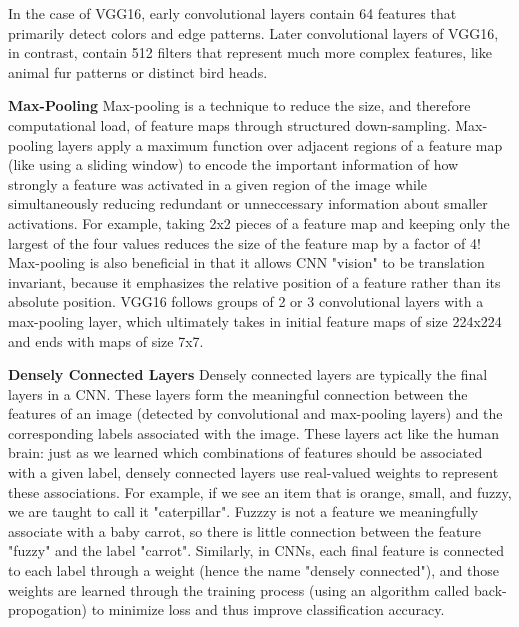 \documentclass{article}\usepackage[]{graphicx}\usepackage[]{color}
\begin{document}
In the case of VGG16, early convolutional layers contain 64 features that primarily detect colors and edge patterns. Later convolutional layers of VGG16, in contrast, contain 512 filters that represent much more complex features, like animal fur patterns or distinct bird heads.

\textbf{Max-Pooling}
Max-pooling is a technique to reduce the size, and therefore computational load, of feature maps through structured down-sampling. Max-pooling layers apply a maximum function over adjacent regions of a feature map (like using a sliding window) to encode the important information of how strongly a feature was activated in a given region of the image while simultaneously reducing redundant or unneccessary information about smaller activations. For example, taking 2x2 pieces of a feature map and keeping only the largest of the four values reduces the size of the feature map by a factor of 4! Max-pooling is also beneficial in that it allows CNN "vision" to be translation invariant, because it emphasizes the relative position of a feature rather than its absolute position. VGG16 follows groups of 2 or 3 convolutional layers with a max-pooling layer, which ultimately takes in initial feature maps of size 224x224 and ends with maps of size 7x7.

\textbf{Densely Connected Layers}
Densely connected layers are typically the final layers in a CNN. These layers form the meaningful connection between the features of an image (detected by convolutional and max-pooling layers) and the corresponding labels associated with the image. These layers act like the human brain: just as we learned which combinations of features should be associated with a given label, densely connected layers use real-valued weights to represent these associations. For example, if we see an item that is orange, small, and fuzzy, we are taught to call it "caterpillar". Fuzzzy is not a feature we meaningfully associate with a baby carrot, so there is little connection between the feature "fuzzy" and the label "carrot". Similarly, in CNNs, each final feature is connected to each label through a weight (hence the name "densely connected"), and those weights are learned through the training process (using an algorithm called back-propogation) to minimize loss and thus improve classification accuracy.
\end{document}
